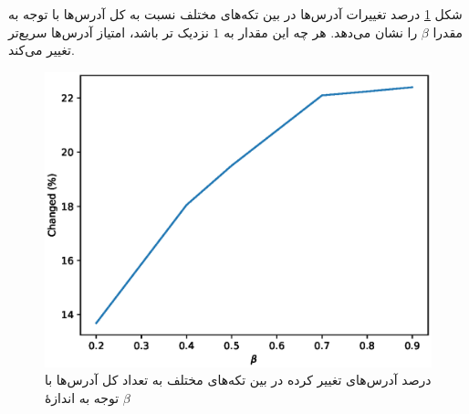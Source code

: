 شکل \ref{fig:betachange} درصد تغییرات آدرس‌ها در بین تکه‌های مختلف نسبت به کل آدرس‌ها با توجه به مقدرا $\beta$ را نشان می‌دهد. هر چه این مقدار به $1$ نزدیک  تر باشد، امتیاز آدرس‌ها سریع‌تر تغییر می‌کند.

\begin{figure}
	\centering
	\includegraphics[width=0.7\linewidth]{image/beta_change}
	\caption{درصد آدرس‌های تغییر کرده در بین تکه‌های مختلف به تعداد کل آدرس‌ها با توجه به اندازهٔ $\beta$}
	\label{fig:betachange}
\end{figure}










